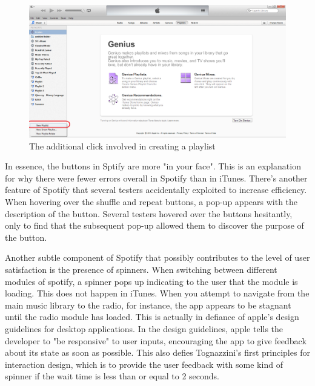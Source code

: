 \documentclass[12pt]{report}
\begin{document}
\begin{figure}[H]
	\centering
	\includegraphics[width=.75\textwidth]{chart9.png}
	\caption{The additional click involved in creating a playlist}
\end{figure}


 In essence, the buttons in Sptify are more "in your face". This is an explanation for why there were fewer errors overall in Spotify than in iTunes. There's another feature of Spotify that several testers accidentally exploited to increase efficiency. When hovering over the shuffle and repeat buttons, a pop-up appears with the description of the button. Several testers hovered over the buttons hesitantly, only to find that the subsequent pop-up allowed them to discover the purpose of the button.

Another subtle component of Spotify that possibly contributes to the level of user satisfaction is the presence of spinners. When switching between different modules of spotify, a spinner pops up indicating to the user that the module is loading. This does not happen in iTunes. When you attempt to navigate from the main music library to the radio, for instance, the app appears to be stagnant until the radio module has loaded. This is actually in defiance of apple's design guidelines  for desktop applications. In the design guidelines, apple tells the developer to  "be responsive" to user inputs, encouraging the app to give feedback about its state as soon as possible. This also defies Tognazzini's first principles for interaction design, which is to provide the user feedback with some kind of spinner if the wait time is less than or equal to 2 seconds.
\end{document}
